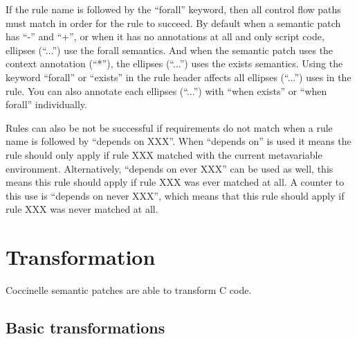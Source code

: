 If the rule name is followed by the ``forall'' keyword, then all control flow
paths must match in order for the rule to succeed. By default when a
semantic patch has ``-'' and ``+'', or when it has no annotations at all and
only script code, ellipses (``...'') use the forall semantics.  And when the
semantic patch uses the context annotation (``*''), the ellipses (``...'') uses
the exists semantics.  Using the keyword ``forall'' or ``exists'' in the rule
header affects all ellipses (``...'') uses in the rule. You can also annotate
each ellipses (``...'') with ``when exists'' or ``when forall'' individually.

Rules can also be not be successful if requirements do not match
when a rule name is followed by ``depends on XXX''. When ``depends on'' is used
it means the rule should only apply if rule XXX matched with the current
metavariable environment. Alternatively, ``depends on ever XXX'' can be used
as well, this means this rule should apply if rule XXX was ever matched at
all. A counter to this use is ``depends on never XXX'', which means that this
rule should apply if rule XXX was never matched at all.

\section{Transformation}

Coccinelle semantic patches are able to transform C code.

\subsection{Basic transformations}

